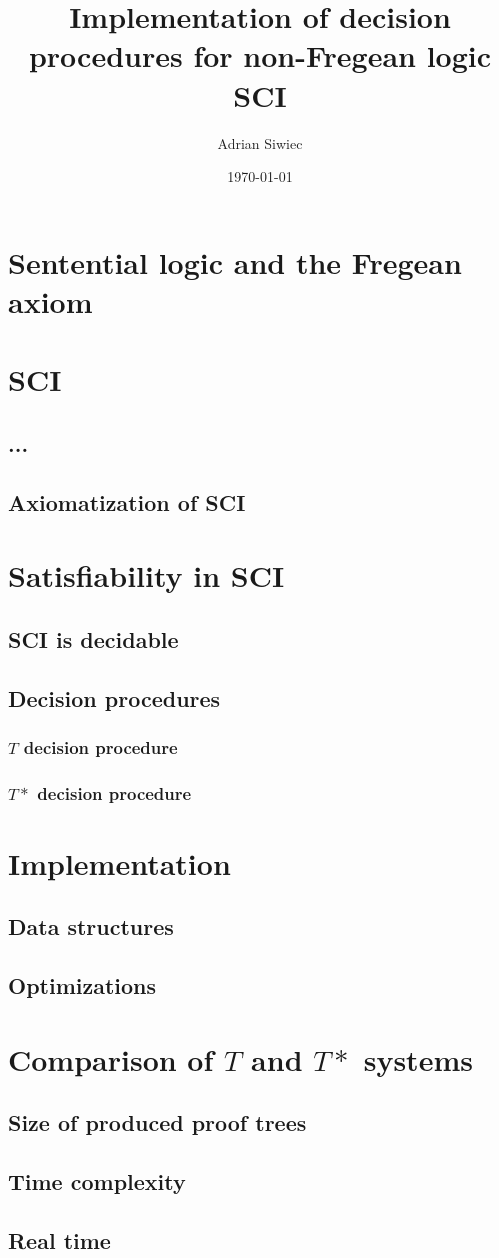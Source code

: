 \documentclass{article}
\title{Implementation of decision procedures for non-Fregean logic SCI}
\author{Adrian Siwiec}
\theoremstyle{definition}
\begin{document}
\date{\today}

\maketitle

\section{Sentential logic and the Fregean axiom}
\section{SCI}
\subsection{...}
\subsection{Axiomatization of SCI}
\section{Satisfiability in SCI}
\subsection{SCI is decidable}
\subsection{Decision procedures}
\subsubsection{$T$ decision procedure}
\subsubsection{$T*$ decision procedure}
\section{Implementation}
\subsection{Data structures}
\subsection{Optimizations}
\section{Comparison of $T$ and $T*$ systems}
\subsection{Size of produced proof trees}
\subsection{Time complexity}
\subsection{Real time}
\end{document}
